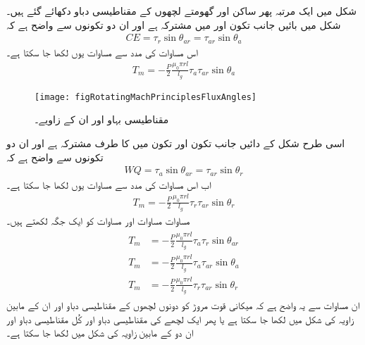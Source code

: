 شکل   میں ایک مرتبہ پھر ساکن اور گھومتے لچھوں کے مقناطیسی دباو دکھائے گئے ہیں۔ شکل میں بائیں جانب تکون  اور  میں  مشترکہ ہے اور ان دو تکونوں سے واضح ہے کہ
\begin{align}
CE=\tau_r \sin \theta_{ar}=\tau_{ar} \sin \theta_a
\end{align}
اس مساوات کی مدد سے مساوات   یوں لکھا جا سکتا ہے۔
\begin{align}\label{مساوات_گھومتے_مشین_مروڑ_بذریعہ_کوتوانائی_ب}
T_m=-\frac{P}{2}\frac{\mu_0 \pi r l}{l_g} \tau_a \tau_{ar}  \sin \theta_a
\end{align}
%
\begin{figure}
\centering
\texttt{[image: figRotatingMachPrinciplesFluxAngles]}
\caption{مقناطیسی بہاو اور ان کے زاویے۔}
\label{شکل_گھومتے_مشین_بہاو_کے_زاویے}
\end{figure}
اسی طرح شکل   کے دائیں جانب تکون  اور تکون  میں  کا طرف مشترکہ ہے اور ان دو تکونوں سے واضح ہے کہ
\begin{align}
WQ=\tau_a \sin \theta_{ar}=\tau_{ar} \sin \theta_r
\end{align}
اب اس مساوات کی مدد سے مساوات   یوں لکھا جا سکتا ہے۔
\begin{align}\label{مساوات_گھومتے_مشین_مروڑ_بذریعہ_کوتوانائی_پ}
T_m=-\frac{P}{2}\frac{\mu_0 \pi r l}{l_g} \tau_r \tau_{ar}  \sin \theta_r
\end{align}
مساوات   مساوات   اور مساوات   کو ایک جگہ لکھتے ہیں۔
\begin{gather}
\begin{aligned}\label{مساوات_گھومتے_مشین_مروڑ_بذریعہ_کوتوانائی_ت}
T_m&=-\frac{P}{2}\frac{\mu_0 \pi r l}{l_g} \tau_a \tau_r \sin \theta_{ar}\\
T_m&=-\frac{P}{2}\frac{\mu_0 \pi r l}{l_g} \tau_a \tau_{ar}  \sin \theta_a\\
T_m&=-\frac{P}{2}\frac{\mu_0 \pi r l}{l_g} \tau_r \tau_{ar}  \sin \theta_r
\end{aligned}
\end{gather}
ان مساوات سے یہ واضح ہے کہ میکانی قوت مروڑ کو دونوں لچھوں کے مقناطیسی دباو اور ان کے مابین زاویہ کی شکل میں لکھا جا سکتا ہے یا پھر ایک لچھے کی مقناطیسی دباو اور کُل مقناطیسی دباو اور ان دو کے مابین زاویہ کی شکل میں لکھا جا سکتا ہے۔

